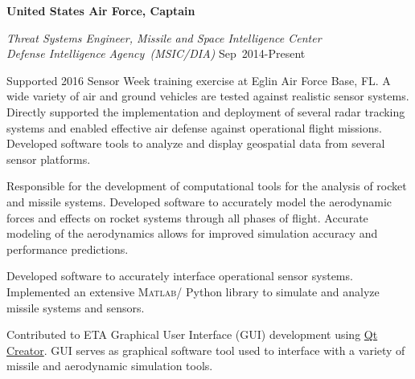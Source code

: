 \documentclass[10pt]{article}
\providecommand\Matlab{\textsc{Matlab}}
\begin{document}
\textbf{United States Air Force, Captain}
\begin{lonelist}

\item[] \textit{Threat Systems Engineer, Missile and Space Intelligence Center \\
				Defense Intelligence Agency~(MSIC/DIA)}
				\hfill {Sep~2014-Present}
		\begin{innerlist}
            \item Supported 2016 Sensor Week training exercise at Eglin Air Force Base, FL.
            A wide variety of air and ground vehicles are tested against realistic sensor systems. 
            Directly supported the implementation and deployment of several radar tracking systems and enabled effective air defense against operational flight missions.
            Developed software tools to analyze and display geospatial data from several sensor platforms.
			\item Responsible for the development of computational tools for the analysis of rocket and missile systems.
			Developed software to accurately model the aerodynamic forces and effects on rocket systems through all phases of flight.
			Accurate modeling of the aerodynamics allows for improved simulation accuracy and performance predictions.
			\item Developed software to accurately interface operational sensor systems.
			Implemented an extensive \Matlab / Python library to simulate and analyze missile systems and sensors. 
            \item Contributed to ETA Graphical User Interface (GUI) development using \href{https://www.qt.io/ide/}{Qt Creator}.
            GUI serves as graphical software tool used to interface with a variety of missile and aerodynamic simulation tools.
		\end{innerlist}
		

\end{lonelist}
\end{document}
